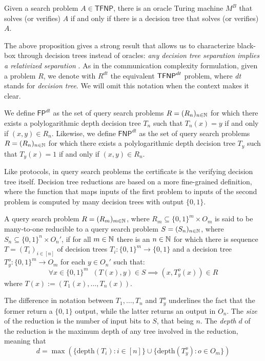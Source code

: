 \begin{proposition}
 Given a search problem $A \in \mathsf{TFNP}$, there is an oracle Turing machine $M^B$ that solves (or verifies) $A$ if and only if there is a decision tree that solves (or verifies) $A$.
\end{proposition}

The above proposition gives a strong result that allows us to characterize black-box \TFNP through decision trees instead of oracles: \textit{any decision tree separation implies a relativized separation} \cite{proofs_circuits_communication, tfnp_characterization}. As in the communication complexity formulation, given a \TFNP problem $R$, we denote with $R^{dt}$ the equivalent $\textsf{TFNP}^{dt}$ problem, where \textit{dt} stands for \textit{decision tree}. We will omit this notation when the context makes it clear.

\begin{definition}
 We define $\mathsf{FP}^{dt}$ as the set of query search problems $R = (R_n)_{n \in \mathbb{N}}$ for which there exists a polylogarithmic depth decision tree $T_n$ such that $T_n(x) = y$ if and only if $(x,y) \in R_n$. Likewise, we define $\mathsf{FNP}^{dt}$ as the set of query search problems $R = (R_n)_{n \in \mathbb{N}}$ for which there exists a polylogarithmic depth decision tree $T_y$ such that $T_y(x) = 1$ if and only if $(x,y) \in R_n$.
\end{definition}

Like protocols, in query search problems the certificate is the verifying decision tree itself. Decision tree reductions are based on a more fine-grained definition, where the function that maps inputs of the first problem to inputs of the second problem is computed by many decision trees with output $\{0,1\}$.

\begin{definition}
 A query search problem $R = (R_m)_{m \in \mathbb{N}}$, where $R_m \subseteq \{0,1\}^m \times O_m$ is said to be many-to-one reducible to a query search problem $S = (S_n)_{n \in \mathbb{N}}$, where $S_n \subseteq \{0,1\}^n \times O_n'$, if for all $m \in \mathbb{N}$ there is an $n \in \mathbb{N}$ for which there is sequence $T = (T_i)_{i \in [n]}$ of decision trees $T_i : \{0,1\}^m \to \{0,1\}$ and a decision tree $T_y^o : \{0,1\}^m \to O_m$ for each $y \in O_n'$ such that:
    \[\forall x \in \{0,1\}^m \;\; (T(x), y) \in S \implies (x, T_y^o(x)) \in R\]
 where $T(x) := (T_1(x), \ldots, T_n(x))$.
\end{definition}

The difference in notation between $T_1, \ldots, T_n$ and $T_y^o$ underlines the fact that the former return a $\{0,1\}$ output, while the latter returns an output in $O_n$. The \textit{size} of the reduction is the number of input bits to $S$, that being $n$. The \textit{depth} $d$ of the reduction is the maximum depth of any tree involved in the reduction, meaning that
\[d = \max (\{\mathrm{depth}(T_i) : i \in [n]\} \cup \{\mathrm{depth}(T_y^o) : o \in O_m\})\]

